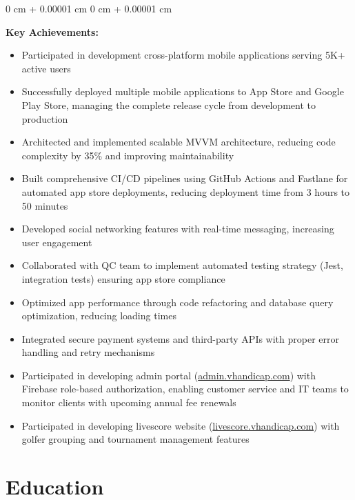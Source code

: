 \documentclass[10pt, letterpaper]{article}
\newenvironment{highlights}{
    \begin{itemize}[
        topsep=0.10 cm,
        parsep=0.10 cm,
        partopsep=0pt,
        itemsep=0pt,
        leftmargin=0 cm + 10pt
    ]
}{
    \end{itemize}
} %
\newenvironment{onecolentry}{
    \begin{adjustwidth}{
        0 cm + 0.00001 cm
    }{
        0 cm + 0.00001 cm
    }
}{
    \end{adjustwidth}
} %
\begin{document}
        \vspace{0.15 cm}
        \begin{onecolentry}
            \textbf{Key Achievements:}
            \begin{highlights}
                \item Participated in development cross-platform mobile applications serving 5K+ active users
                \item Successfully deployed multiple mobile applications to App Store and Google Play Store, managing the complete release cycle from development to production
                \item Architected and implemented scalable MVVM architecture, reducing code complexity by 35\% and improving maintainability
                \item Built comprehensive CI/CD pipelines using GitHub Actions and Fastlane for automated app store deployments, reducing deployment time from 3 hours to 50 minutes
                \item Developed social networking features with real-time messaging, increasing user engagement
                \item Collaborated with QC team to implement automated testing strategy (Jest, integration tests) ensuring app store compliance
                \item Optimized app performance through code refactoring and database query optimization, reducing loading times
                \item Integrated secure payment systems and third-party APIs with proper error handling and retry mechanisms
                \item Participated in developing admin portal (\href{https://admin.vhandicap.com}{admin.vhandicap.com}) with Firebase role-based authorization, enabling customer service and IT teams to monitor clients with upcoming annual fee renewals
                \item Participated in developing livescore website (\href{https://livescore.vhandicap.com}{livescore.vhandicap.com}) with golfer grouping and tournament management features
            \end{highlights}
        \end{onecolentry}

    \section{Education}
\end{document}

